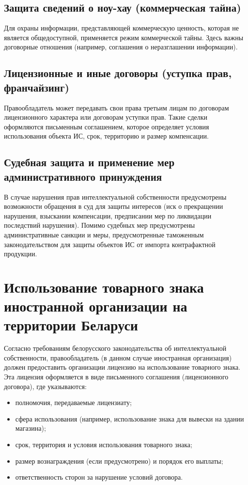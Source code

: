 \documentclass{bsuir}
\begin{document}
\subsection*{Защита сведений о ноу-хау (коммерческая тайна)}

Для охраны информации, представляющей коммерческую ценность, которая не является
общедоступной, применяется режим коммерческой тайны. Здесь важны договорные
отношения (например, соглашения о неразглашении информации).

\subsection*{Лицензионные и иные договоры (уступка прав, франчайзинг)}

Правообладатель может передавать свои права третьим лицам по договорам
лицензионного характера или договорам уступки прав. Такие сделки оформляются
письменным соглашением, которое определяет условия использования объекта ИС,
срок, территорию и размер компенсации.

\subsection*{Судебная защита и применение мер административного принуждения}

В случае нарушения прав интеллектуальной собственности предусмотрены возможности
обращения в суд для защиты интересов (иск о прекращении нарушения, взыскании
компенсации, предписании мер по ликвидации последствий нарушения). Помимо
судебных мер предусмотрены административные санкции и меры, предусмотренные
таможенным законодательством для защиты объектов ИС от импорта контрафактной
продукции.

\section{Использование товарного знака иностранной организации на территории Беларуси}

Согласно требованиям белорусского законодательства об интеллектуальной
собственности, правообладатель (в данном случае иностранная организация) должен
предоставить организации лицензию на использование товарного знака. Эта лицензия
оформляется в виде письменного соглашения (лицензионного договора), где
указываются:

\begin{itemize}
    \item
    полномочия, передаваемые лицензиату;
    \item
    сфера использования (например, использование знака для вывески на здании магазина);
    \item
    срок, территория и условия использования товарного знака;
    \item
    размер вознаграждения (если предусмотрено) и порядок его выплаты;
    \item
    ответственность сторон за нарушение условий договора.
\end{itemize}
\end{document}
